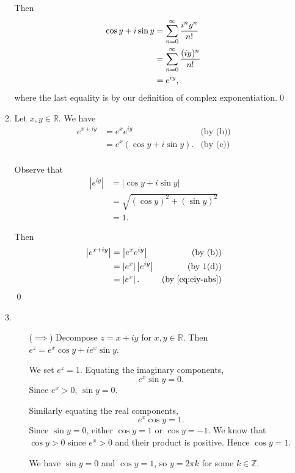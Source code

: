\documentclass[oneside]{article}
\newcommand\abs[1]{\left|#1\right|}
\newcommand\bbR{\mathbb{R}}
\newcommand\bbZ{\mathbb{Z}}
\begin{document}
\begin{enumerate}[label=\textbf{\arabic*.}]
\begin{enumerate}[label=\textbf{(\alph*)}]
    Then \begin{align*}
      \cos y + i\sin y &= \sum_{n=0}^\infty \frac{i^ny^n}{n!} \\
      &= \sum_{n=0}^\infty \frac{(iy)^n}{n!} \\
      &= e^{iy}\text,
    \end{align*} where the last equality is by our definition of complex
    exponentiation.\qed

    \item Let $x, y \in \bbR$. We have \begin{align*}
      e^{x+iy} &= e^xe^{iy} & \text{(by (b))} \\
      &= e^x(\cos y + i\sin y) \text{.} & \text{(by (c))} \\
    \end{align*}

    Observe that \begin{align}
      \label{eq:eiy-abs}
      \abs{e^{iy}} &= \abs{\cos y + i\sin y} \nonumber\\
      &= \sqrt{(\cos y)^2 + (\sin y)^2} \\
      &= 1 \text{.} \nonumber
    \end{align}

    Then \begin{align*}
      \abs{e^{x + iy}} &= \abs{e^xe^{iy}} & \text{(by (b))} \\
      &= \abs{e^x}\abs{e^{iy}} & \text{(by 1(d))} \\
      &=\abs{e^x}\text{.} & \text{(by \eqref{eq:eiy-abs})}
    \end{align*}\qed

    \item \begin{itemize}[leftmargin=34pt]
      \item[($\implies$)]
      Decompose $z = x + iy$ for $x, y \in \bbR$. Then
        $e^z = e^x\cos y + ie^x \sin y$.

        We set $e^z = 1$. Equating the imaginary components,\[
          e^x\sin y = 0 \text{.}
        \] Since $e^x > 0$, $\sin y = 0$.

        Similarly equating the real components,\[
          e^x\cos y = 1 \text{.}
        \] Since $\sin y = 0$, either $\cos y = 1$ or $\cos y = -1$. We know
        that $\cos y > 0$ since $e^x > 0$ and their product is positive. Hence
        $\cos y = 1$.

        We have $\sin y = 0$ and $\cos y = 1$, so $y = 2\pi k$ for some
        $k \in \bbZ$.


\end{itemize}
\end{enumerate}
\end{enumerate}
\end{document}
